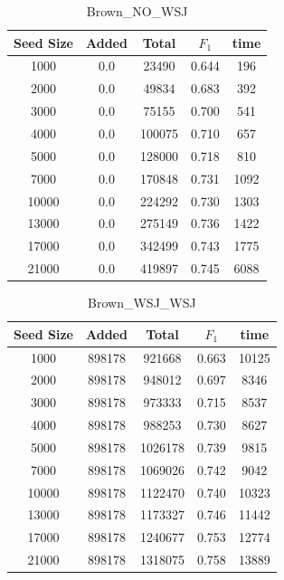 \documentclass[journal, a4paper]{IEEEtran}
\begin{document}
	\begin{table}[!hbt]
		\begin{center}
		\caption{Brown\_NO\_WSJ}
		\label{tab:6}
		\begin{tabular}{|c|c|c|c|c|}
			\hline
			Seed Size & Added & Total & $F_{1}$ & time\\ \hline
			  1000  & 0.0 & 23490 & 0.644 & 196\\ \hline
			  2000  & 0.0 & 49834 & 0.683 & 392\\ \hline
			  3000  & 0.0 & 75155 & 0.700 & 541\\ \hline
			  4000  & 0.0 & 100075 & 0.710 & 657\\ \hline
			  5000  & 0.0 & 128000 & 0.718 & 810\\ \hline
			  7000  & 0.0 & 170848 & 0.731 & 1092\\ \hline
			  10000  & 0.0 & 224292 & 0.730 & 1303\\ \hline
			  13000  & 0.0 & 275149 & 0.736 & 1422\\ \hline
			  17000  & 0.0 & 342499 & 0.743 & 1775\\ \hline
			  21000  & 0.0 & 419897 & 0.745 & 6088\\
			 \hline
		\end{tabular}
		\end{center}
		\vspace{-5mm}
	\end{table}
	
		\begin{table}[!hbt]
		\begin{center}
		\caption{Brown\_WSJ\_WSJ}
		\label{tab:7}
		\begin{tabular}{|c|c|c|c|c|}
			\hline
			Seed Size & Added & Total & $F_{1}$ & time\\ \hline
			  1000  & 898178 & 921668 & 0.663 & 10125\\ \hline
			  2000  & 898178 & 948012 & 0.697 & 8346\\ \hline
			  3000  & 898178 & 973333 & 0.715 & 8537\\ \hline
			  4000  & 898178 & 988253 & 0.730 & 8627\\ \hline
			  5000  & 898178 & 1026178 & 0.739 & 9815\\ \hline
			  7000  & 898178 & 1069026 & 0.742 & 9042\\ \hline
			  10000  & 898178 & 1122470 & 0.740 & 10323\\ \hline
			  13000  & 898178 & 1173327 & 0.746 & 11442\\ \hline
			  17000  & 898178 & 1240677 & 0.753 & 12774\\ \hline
			  21000  & 898178 & 1318075 & 0.758 & 13889\\
			 \hline
		\end{tabular}
		\end{center}
		\vspace{-5mm}
	\end{table}
	
\end{document}
